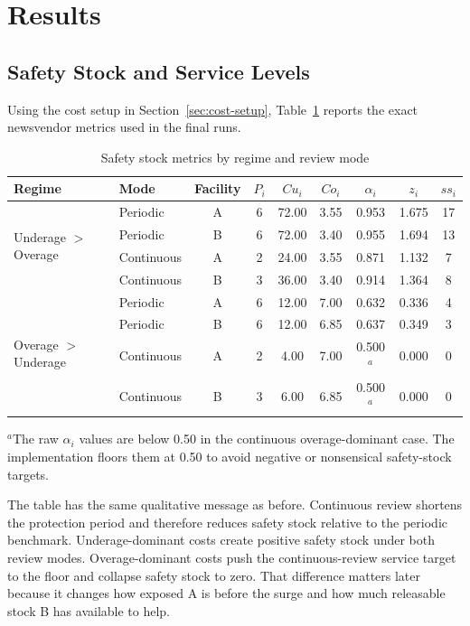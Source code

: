 \documentclass[11pt]{article}
\begin{document}
\section{Results}
\subsection{Safety Stock and Service Levels}
Using the cost setup in Section~\ref{sec:cost-setup}, Table~\ref{tab:ss-metrics} reports the exact newsvendor metrics used in the final runs.

\begin{table}[H]
\centering
\caption{Safety stock metrics by regime and review mode}
\label{tab:ss-metrics}
\begin{tabular}{llccccccc}
\toprule
Regime & Mode & Facility & $P_i$ & $Cu_i$ & $Co_i$ & $\alpha_i$ & $z_i$ & $ss_i$ \\
\midrule
\multirow{4}{*}{Underage $>$ Overage}
& Periodic & A & 6 & 72.00 & 3.55 & 0.953 & 1.675 & 17 \\
& Periodic & B & 6 & 72.00 & 3.40 & 0.955 & 1.694 & 13 \\
& Continuous & A & 2 & 24.00 & 3.55 & 0.871 & 1.132 & 7 \\
& Continuous & B & 3 & 36.00 & 3.40 & 0.914 & 1.364 & 8 \\
\midrule
\multirow{4}{*}{Overage $>$ Underage}
& Periodic & A & 6 & 12.00 & 7.00 & 0.632 & 0.336 & 4 \\
& Periodic & B & 6 & 12.00 & 6.85 & 0.637 & 0.349 & 3 \\
& Continuous & A & 2 & 4.00 & 7.00 & 0.500$^{a}$ & 0.000 & 0 \\
& Continuous & B & 3 & 6.00 & 6.85 & 0.500$^{a}$ & 0.000 & 0 \\
\bottomrule
\end{tabular}
\begin{flushleft}
\footnotesize $^{a}$The raw $\alpha_i$ values are below 0.50 in the continuous overage-dominant case. The implementation floors them at 0.50 to avoid negative or nonsensical safety-stock targets.
\end{flushleft}
\end{table}

The table has the same qualitative message as before. Continuous review shortens the protection period and therefore reduces safety stock relative to the periodic benchmark. Underage-dominant costs create positive safety stock under both review modes. Overage-dominant costs push the continuous-review service target to the floor and collapse safety stock to zero. That difference matters later because it changes how exposed A is before the surge and how much releasable stock B has available to help.
\end{document}
